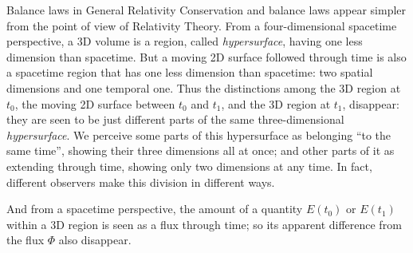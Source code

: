 \documentclass[a4paper,12pt,%
onecolumn,oneside,%
british%
]{memoir}
\renewcommand*{\|}[1][]{\nonscript\:#1\vert\nonscript\:\mathopen{}}
\newcommand*{\yti}{t_{0}}
\newcommand*{\ytf}{t_{1}}
\newcommand*{\yE}{E}
\newcommand*{\yH}{\varPhi}%
\begin{document}
\begin{extra}{Balance laws in General Relativity}
  Conservation and balance laws appear simpler from the point of view of Relativity Theory. From a four-dimensional spacetime perspective, a 3D volume is a region, called \emph{hypersurface}, having one less dimension than spacetime. But a moving 2D surface followed through time is also a spacetime region that has one less dimension than spacetime: two spatial dimensions and one temporal one. Thus the distinctions among the 3D region at $\yti$, the moving 2D surface between $\yti$ and $\ytf$, and the 3D region at $\ytf$, disappear: they are seen to be just different parts of the same three-dimensional \emph{hypersurface}. We perceive some parts of this hypersurface as belonging \enquote{to the same time}, showing their three dimensions all at once; and other parts of it as extending through time, showing only two dimensions at any time. In fact, different observers make this division in different ways.

  \smallskip

  And from a spacetime perspective, the amount of a quantity $\yE(\yti)$ or $\yE(\ytf)$ within a 3D region is seen as a flux through time; so its apparent difference from the flux $\yH$ also disappear. %
\end{extra}
%
%
\end{document}
